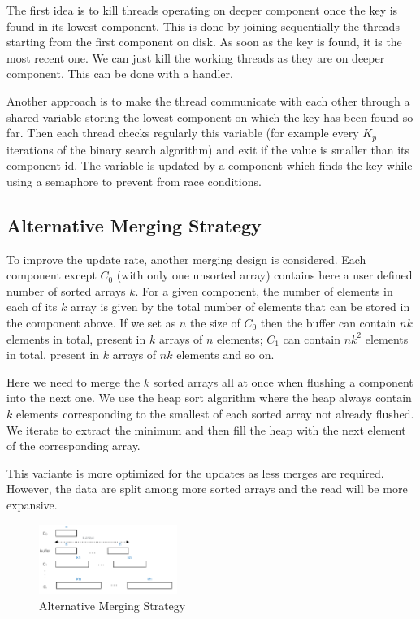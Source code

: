 \documentclass{sig-alternate-05-2015}
\begin{document}
The first idea is to kill threads operating on deeper component once the key is found in its lowest component. This is done by joining sequentially the threads starting from the first component on disk. As soon as the key is found, it is the most recent one. We can just kill the working threads as they are on deeper component. This can be done with a handler.

Another approach is to make the thread communicate with each other through a shared variable storing the lowest component on which the key has been found so far. Then each thread checks regularly this variable (for example every $K_p$ iterations of the binary search algorithm) and exit if the value is smaller than its component id. The variable is updated by a component which finds the key while using a semaphore to prevent from race conditions.

\subsection{Alternative Merging Strategy}

To improve the update rate, another merging design is considered. Each component except $C_0$ (with only one unsorted array) contains here a user defined number of sorted arrays $k$. For a given component, the number of elements in each of its $k$ array is given by the total number of elements that can be stored in the component above. If we set as $n$ the size of $C_0$ then the buffer can contain $nk$ elements in total, present in $k$ arrays of $n$ elements; $C_1$ can contain $nk^2$ elements in total, present in $k$ arrays of $nk$ elements and so on.

Here we need to merge the $k$ sorted arrays all at once when flushing a component into the next one. We use the heap sort algorithm where the heap always contain $k$ elements corresponding to the smallest of each sorted array not already flushed. We iterate to extract the minimum and then fill the heap with the next element of the corresponding array.

This variante is more optimized for the updates as less merges are required. However, the data are split among more sorted arrays and the read will be more expansive.

\begin{figure}[H]
\begin{center}
    \includegraphics[width=0.4\textwidth]{varlsm}
    \caption{Alternative Merging Strategy}
\end{center}
\end{figure}
\end{document}
